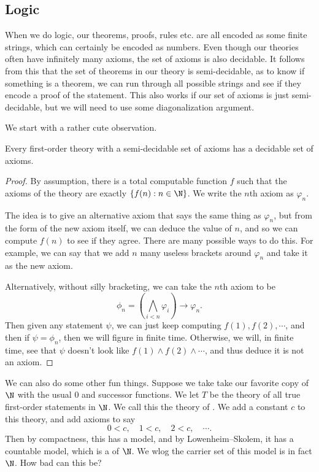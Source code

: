 \documentclass[a4paper]{article}
\begin{document}
\subsection{Logic}
When we do logic, our theorems, proofs, rules etc. are all encoded as some finite strings, which can certainly be encoded as numbers. Even though our theories often have infinitely many axioms, the set of axioms is also decidable. It follows from this that the set of theorems in our theory is semi-decidable, as to know if something is a theorem, we can run through all possible strings and see if they encode a proof of the statement. This also works if our set of axioms is just semi-decidable, but we will need to use some diagonalization argument.

We start with a rather cute observation.
\begin{thm}
  Every first-order theory with a semi-decidable set of axioms has a decidable set of axioms.
\end{thm}

\begin{proof}
  By assumption, there is a total computable function $f$ such that the axioms of the theory are exactly $\{f(n): n \in \N\}$. We write the $n$th axiom as $\varphi_n$.

  The idea is to give an alternative axiom that says the same thing as $\varphi_n$, but from the form of the new axiom itself, we can deduce the value of $n$, and so we can compute $f(n)$ to see if they agree. There are many possible ways to do this. For example, we can say that we add $n$ many useless brackets around $\varphi_n$ and take it as the new axiom.

  Alternatively, without silly bracketing, we can take the $n$th axiom to be
  \[
    \phi_n = \left(\bigwedge_{i < n} \varphi_i\right) \to \varphi_n.
  \]
  Then given any statement $\psi$, we can just keep computing $f(1), f(2), \cdots$, and then if $\psi = \phi_n$, then we will figure in finite time. Otherwise, we will, in finite time, see that $\psi$ doesn't look like $f(1) \wedge f(2) \wedge \cdots $, and thus deduce it is not an axiom.
\end{proof}

We can also do some other fun things. Suppose we take take our favorite copy of $\N$ with the usual $0$ and successor functions. We let $T$ be the theory of all true first-order statements in $\N$. We call this the theory of . We add a constant $c$ to this theory, and add axioms to say
\[
  0 < c,\quad 1 < c, \quad 2 < c, \quad \cdots.
\]
Then by compactness, this has a model, and by Lowenheim--Skolem, it has a countable model, which is a  of $\N$. We wlog the carrier set of this model is in fact $\N$. How bad can this be?
\end{document}
